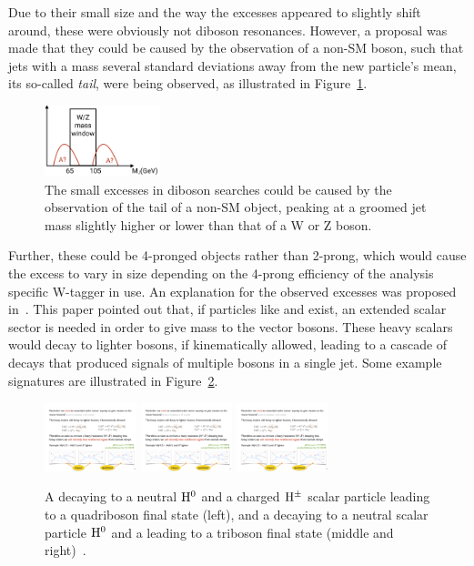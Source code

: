 Due to their small size and the way the excesses appeared to slightly shift around, these were obviously not diboson resonances. However, a proposal was made that they could be caused by the observation of a non-SM boson, such that jets with a mass several standard deviations away from the new particle's mean, its so-called {\it tail}, were being observed, as illustrated in Figure~\ref{fig:searchIII:tails}.
\begin{figure}[h!] 
    \centering
    \includegraphics[width=0.3\textwidth]{figures/analysis/search3/misc/tails.png}
    \caption{The small excesses in diboson searches could be caused by the observation of the tail of a non-SM object, peaking at a groomed jet mass slightly higher or lower than that of a W or Z boson.}
    \label{fig:searchIII:tails}
\end{figure}
Further, these could be 4-pronged objects rather than 2-prong, which would cause the excess to vary in size depending on the 4-prong efficiency of the analysis specific W-tagger in use. An explanation for the observed excesses was proposed in~\cite{Aguilar-Saavedra:2018xpl}. This paper pointed out that, if particles like \PWpr and \PZpr exist, an extended scalar sector is needed in order to give mass to the
vector bosons. These heavy scalars would decay to lighter bosons, if kinematically allowed, leading to a cascade of decays that produced signals of multiple bosons in a single jet. Some example signatures are illustrated in Figure~\ref{fig:searchIII:tribosons}.
\begin{figure}[h!] 
    \centering
    \includegraphics[height=2cm]{figures/analysis/search3/misc/quadri.pdf}
    \includegraphics[height=2cm]{figures/analysis/search3/misc/tri1.pdf}
    \includegraphics[height=2cm]{figures/analysis/search3/misc/tri2.pdf}
    \caption{A \PWpr decaying to a neutral $\rm{H}^0$ and a charged $\rm{H}^{\pm}$ scalar particle leading to a quadriboson final state (left), and a \PWpr decaying to a neutral scalar particle $\rm{H}^0$ and a \PW leading to a triboson final state (middle and right)~\cite{Aguilar-Saavedra:2018xpl}.}
    \label{fig:searchIII:tribosons}
\end{figure}
